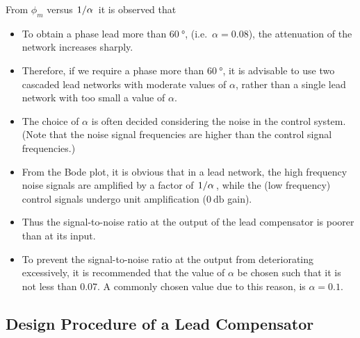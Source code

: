 \documentclass[
  14pt,
  a4paper,
  oneside,
  open=any,
  a4paper,
  14pt]{report}
\begin{document}
From \(\phi_m\) versus \(\left.1\middle\slash\alpha\right.\) it is observed that

\begin{itemize}
\item
  To obtain a phase lead more than \(\SI{60}{\degree}\),
  (i.e.~\(\alpha = 0.08\)), the attenuation of the network increases
  sharply.
\item
  Therefore, if we require a phase more than \(\SI{60}{\degree}\), it is
  advisable to use two cascaded lead networks with moderate values of
  \(\alpha\), rather than a single lead network with too small a value
  of \(\alpha\).
\item
  The choice of \(\alpha\) is often decided considering the noise in the
  control system. (Note that the noise signal frequencies are higher
  than the control signal frequencies.)
\item
  From the Bode plot, it is obvious that in a lead network, the high
  frequency noise signals are amplified by a factor of
  \(\left.1\middle\slash\alpha\right.\), while the (low frequency) control signals
  undergo unit amplification (\(\SI{0}{\decibel}\) gain).
\item
  Thus the signal-to-noise ratio at the output of the lead compensator
  is poorer than at its input.
\item
  To prevent the signal-to-noise ratio at the output from deteriorating
  excessively, it is recommended that the value of \(\alpha\) be chosen
  such that it is not less than 0.07. A commonly chosen value due to
  this reason, is \(\alpha = 0.1\).
\end{itemize}

\subsection{Design Procedure of a Lead
Compensator}\label{design-procedure-of-a-lead-compensator}
\end{document}
